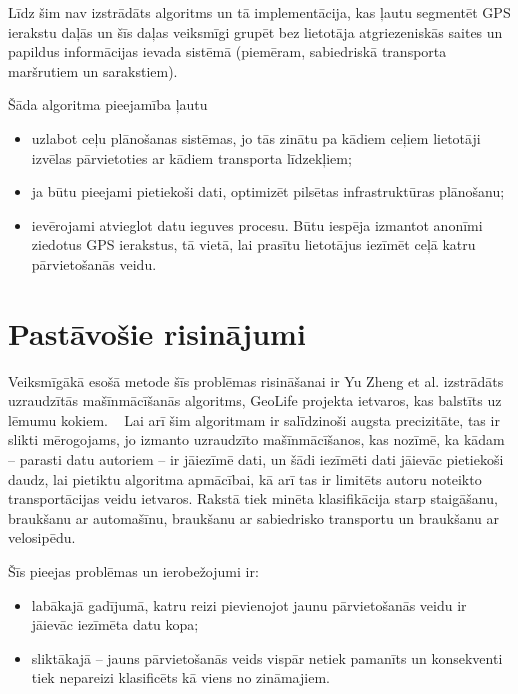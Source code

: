 \documentclass{ludis}
\begin{document}
Līdz šim nav izstrādāts algoritms un tā implementācija, kas ļautu seg\-mentēt GPS ierakstu daļās un 
šīs daļas veiksmīgi grupēt bez lietotāja atgrie\-zeniskās saites un papildus informācijas ievada
sistēmā (piemēram, sabiedriskā transporta maršrutiem un sarakstiem).

Šāda algoritma pieejamība ļautu 
\begin{itemize}
\item uzlabot ceļu plānošanas sistēmas, jo tās zinātu pa kādiem ceļiem lieto\-tāji izvēlas
  pārvietoties ar kādiem transporta līdzekļiem;
\item ja būtu pieejami pietiekoši dati, optimizēt pilsētas infrastruktūras \linebreak plānošanu;
\item ievērojami atvieglot datu ieguves procesu. Būtu iespēja izmantot ano\-nīmi ziedotus GPS 
  ierakstus, tā vietā, lai prasītu lietotājus iezīmēt ceļā katru pārvietošanās veidu.
\end{itemize}

\section{Pastāvošie risinājumi}
Veiksmīgākā esošā metode šīs problēmas risināšanai ir Yu Zheng et al. izstrā\-dāts uzraudzītās
mašīnmācīšanās algoritms, GeoLife projekta ietvaros, kas balstīts uz lēmumu 
kokiem. ~\cite{zheng_gps_segmentation} Lai arī šim algoritmam ir salīdzinoši augsta precizitāte, 
tas ir slikti mērog\-ojams, jo izmanto uzraudzīto mašīn\-mācīšanos, kas nozīmē, ka kādam -- parasti
datu autoriem -- ir jāiezīmē dati, un šādi iezīmēti dati jāievāc pietie\-koši daudz, lai pietiktu
algoritma apmācībai, kā arī tas ir limitēts autoru 
noteikto transportācijas veidu iet\-varos. Rakstā tiek minēta klasifikācija starp staigāšanu, 
braukšanu ar \linebreak automašīnu, braukšanu ar sabiedrisko transportu un braukšanu ar velo\-sipēdu. 

Šīs pieejas problēmas un ierobežojumi ir:
\begin{itemize}
\item labākajā gadījumā, katru reizi pievienojot jaunu pārvietošanās veidu ir jāievāc iezīmēta datu 
  kopa;
\item sliktākajā -- jauns pārvietošanās veids vispār netiek pamanīts un \linebreak 
  konsekventi tiek nepareizi klasificēts kā viens no zināmajiem.
\end{itemize}
\end{document}
